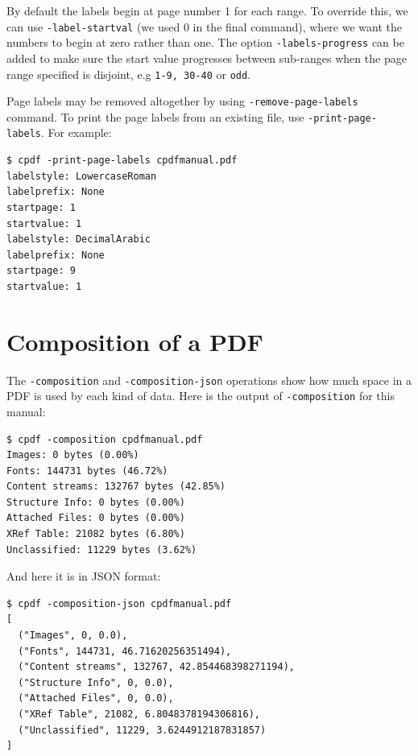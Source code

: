 \documentclass{book}
\begin{document}
\noindent By default the labels begin at page number 1 for each range. To override this, we can use \texttt{-label-startval} (we used $0$ in the final command), where we want the numbers to begin at zero rather than one. The option \texttt{-labels-progress} can be added to make sure the  start value progresses between sub-ranges when the page range specified is disjoint, e.g \texttt{1-9, 30-40} or \texttt{odd}.

Page labels may be removed altogether by using \texttt{-remove-page-labels} command. To print the page labels from an existing file, use \texttt{-print-page-labels}. For example:
\begin{framed}\small\begin{verbatim}$ cpdf -print-page-labels cpdfmanual.pdf
labelstyle: LowercaseRoman
labelprefix: None
startpage: 1
startvalue: 1
labelstyle: DecimalArabic
labelprefix: None
startpage: 9
startvalue: 1
\end{verbatim}
\end{framed}\pagestyle{empty}\thispagestyle{fancy}

\section{Composition of a PDF}

The \texttt{-composition} and \texttt{-composition-json} operations show how much space in a PDF is used by each kind of data. Here is the output of \texttt{-composition} for this manual:

\begin{framed}\small\begin{verbatim}$ cpdf -composition cpdfmanual.pdf
Images: 0 bytes (0.00%)
Fonts: 144731 bytes (46.72%)
Content streams: 132767 bytes (42.85%)
Structure Info: 0 bytes (0.00%)
Attached Files: 0 bytes (0.00%)
XRef Table: 21082 bytes (6.80%)
Unclassified: 11229 bytes (3.62%)
\end{verbatim}
\end{framed}\pagestyle{empty}\thispagestyle{fancy}

\noindent And here it is in JSON format:

\begin{framed}\small\begin{verbatim}$ cpdf -composition-json cpdfmanual.pdf
[
  ("Images", 0, 0.0),
  ("Fonts", 144731, 46.71620256351494),
  ("Content streams", 132767, 42.854468398271194),
  ("Structure Info", 0, 0.0),
  ("Attached Files", 0, 0.0),
  ("XRef Table", 21082, 6.8048378194306816),
  ("Unclassified", 11229, 3.6244912187831857)
]
\end{verbatim}
\end{framed}\pagestyle{empty}\thispagestyle{fancy}
\end{document}
